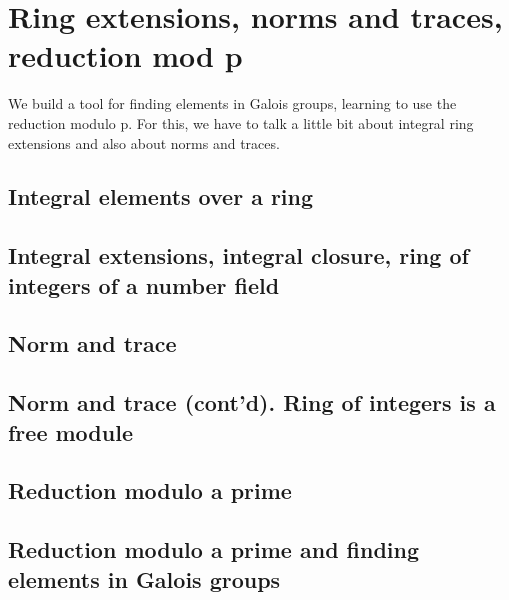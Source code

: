 \chapter{Ring extensions, norms and traces, reduction mod p}
We build a tool for finding elements in Galois groups, learning to use
the reduction modulo p. For this, we have to talk a little bit about
integral ring extensions and also about norms and traces.


\section{Integral elements over a ring}
\section{Integral extensions, integral closure, ring of integers of a number field}
\section{Norm and trace}
\section{Norm and trace (cont'd). Ring of integers is a free module}
\section{Reduction modulo a prime}
\section{Reduction modulo a prime and finding elements in Galois groups}
